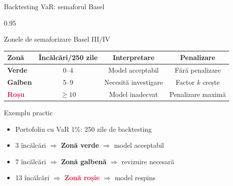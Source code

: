 \documentclass[9pt, aspectratio=169, t]{beamer}
\begin{document}
\begin{frame}{Backtesting VaR: semaforul Basel}
    \begin{cminipage}{0.95\textwidth}
        \begin{block}{Zonele de semaforizare Basel III/IV}
            \begin{center}
                \begin{tabular}{lccc}
                    \toprule
                    \textbf{Zonă} & \textbf{Încălcări/250 zile} & \textbf{Interpretare} & \textbf{Penalizare} \\
                    \midrule
                    \cellcolor{Forest!15}\textcolor{Forest}{\textbf{Verde}} & 0--4 & Model acceptabil & Fără penalizare \\
                    \cellcolor{Amber!15}\textcolor{Amber}{\textbf{Galben}} & 5--9 & Necesită investigare & Factor $k$ crește \\
                    \cellcolor{Crimson!15}\textcolor{Crimson}{\textbf{Roșu}} & $\geq 10$ & Model inadecvat & Penalizare maximă \\
                    \bottomrule
                \end{tabular}
            \end{center}
        \end{block}

        \vspace{0.2cm}

        \begin{exampleblock}{Exemplu practic}
            \begin{itemize}\setlength{\itemsep}{0pt}
                \item Portofoliu cu VaR 1\%: 250 zile de backtesting
                \item 3 încălcări $\Rightarrow$ \textcolor{Forest}{\textbf{Zonă verde}} $\Rightarrow$ model acceptabil
                \item 7 încălcări $\Rightarrow$ \textcolor{Amber}{\textbf{Zonă galbenă}} $\Rightarrow$ revizuire necesară
                \item 13 încălcări $\Rightarrow$ \textcolor{Crimson}{\textbf{Zonă roșie}} $\Rightarrow$ model respins
            \end{itemize}
        \end{exampleblock}
    \end{cminipage}
\end{frame}

\end{document}
